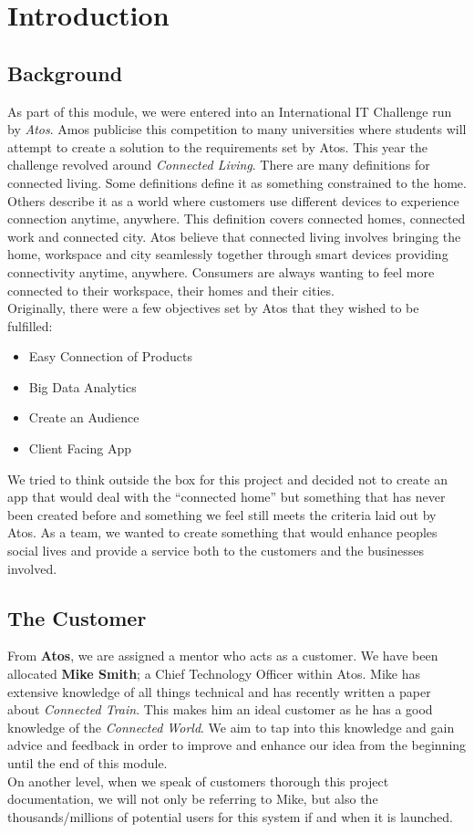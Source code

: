 \section{Introduction}

\subsection{Background}
As part of this module, we were entered into an International IT Challenge run by \emph{Atos}.  Amos publicise this competition to many universities where students will attempt to create a solution to the requirements set by Atos.  This year the challenge revolved around \emph{Connected Living}.  There are many definitions for connected living.  Some definitions define it as something constrained to the home.  Others describe it as a world where customers use different devices to experience connection anytime, anywhere.  This definition covers connected homes, connected work and connected city.  Atos believe that connected living involves bringing the home, workspace and city seamlessly together through smart devices providing connectivity anytime, anywhere.  Consumers are always wanting to feel more connected to their workspace, their homes and their cities.  \\
Originally, there were a few objectives set by Atos that they wished to be fulfilled:
\begin{itemize}
\item Easy Connection of Products
\item Big Data Analytics
\item Create an Audience
\item Client Facing App
\end{itemize}
We tried to think outside the box for this project and decided not to create an app that would deal with the ``connected home'' but something that has never been created before and something we feel still meets the criteria laid out by Atos.  As a team, we wanted to create something that would enhance peoples social lives and provide a service both to the customers and the businesses involved.  

\subsection{The Customer}
From \textbf{Atos}, we are assigned a mentor who acts as a customer.  We have been allocated \textbf{Mike Smith}; a Chief Technology Officer within Atos.  Mike has extensive knowledge of all things technical and has recently written a paper about \emph{Connected Train}.  This makes him an ideal customer as he has a good knowledge of the \emph{Connected World}.  We aim to tap into this knowledge and gain advice and feedback in order to improve and enhance our idea from the beginning until the end of this module.  \\
On another level, when we speak of customers thorough this project documentation, we will not only be referring to Mike, but also the thousands/millions of potential users for this system if and when it is launched.  

